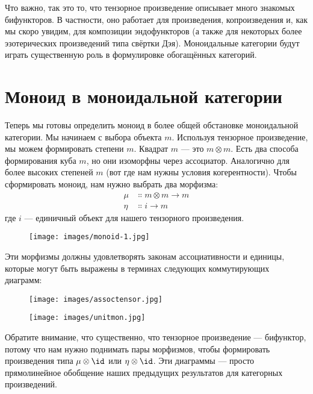 Что важно, так это то, что тензорное произведение описывает много знакомых
бифункторов. В частности, оно работает для произведения, копроизведения и, как
мы скоро увидим, для композиции эндофункторов (а также для
некоторых более эзотерических произведений типа свёртки Дэя). Моноидальные категории
будут играть существенную роль в формулировке обогащённых категорий.

\section{Моноид в моноидальной категории}

Теперь мы готовы определить моноид в более общей обстановке
моноидальной категории. Мы начинаем с выбора объекта $m$. Используя
тензорное произведение, мы можем формировать степени $m$. Квадрат
$m$ --- это $m \otimes m$. Есть два способа формирования куба
$m$, но они изоморфны через ассоциатор. Аналогично
для более высоких степеней $m$ (вот где нам нужны условия
когерентности). Чтобы сформировать моноид, нам нужно выбрать два морфизма:
\begin{align*}
  \mu  & \Colon m \otimes m \to m \\
  \eta & \Colon i \to m
\end{align*}
где $i$ --- единичный объект для нашего тензорного произведения.

\begin{figure}[H]
  \centering
  \texttt{[image: images/monoid-1.jpg]}
\end{figure}

\noindent
Эти морфизмы должны удовлетворять законам ассоциативности и единицы, которые могут быть
выражены в терминах следующих коммутирующих диаграмм:

\begin{figure}[H]
  \centering
  \texttt{[image: images/assoctensor.jpg]}
\end{figure}

\begin{figure}[H]
  \centering
  \texttt{[image: images/unitmon.jpg]}
\end{figure}

\noindent
Обратите внимание, что существенно, что тензорное произведение --- бифунктор,
потому что нам нужно поднимать пары морфизмов, чтобы формировать произведения типа
$\mu \otimes \id$ или $\eta \otimes \id$. Эти диаграммы --- просто
прямолинейное обобщение наших предыдущих результатов для категорных
произведений.

